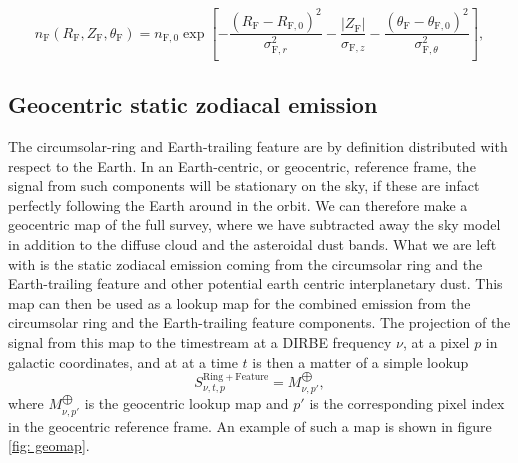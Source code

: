 \documentclass{aa}
\begin{document}
\begin{equation}\label{eq: feature}
   n_\mathrm{F}(R_\mathrm{F}, Z_\mathrm{F}, \theta_\mathrm{F}) = n_{\mathrm{F}, 0} \exp \left[-\frac{\left(R_\mathrm{F}-R_{\mathrm{F}, 0}\right)^{2}}{\sigma_{\mathrm{F}, r}^{2}}-\frac{\left|Z_\mathrm{F}\right|}{\sigma_{\mathrm{F}, z}}-\frac{\left(\theta_\mathrm{F}-\theta_{\mathrm{F}, 0}\right)^{2}}{\sigma_{\mathrm{F}, \theta }^{2}}\right],
\end{equation}

\subsection{Geocentric static zodiacal emission}
The circumsolar-ring and Earth-trailing feature are by definition distributed with respect to the Earth. In an Earth-centric, or geocentric, reference frame, the signal from such components will be stationary on the sky, if these are infact perfectly following the Earth around in the orbit. We can therefore make a geocentric map of the full survey, where we have subtracted away the sky model in addition to the diffuse cloud and the asteroidal dust bands. What we are left with is the static zodiacal emission coming from the circumsolar ring and the Earth-trailing feature and other potential earth centric interplanetary dust. This map can then be used as a lookup map for the combined emission from the circumsolar ring and the Earth-trailing feature components. The projection of the signal from this map to the timestream at a DIRBE frequency $\nu$, at a pixel $p$ in galactic coordinates, and at at a time $t$ is then a matter of a simple lookup
\begin{equation}
    S_{\nu, t, p}^{\mathrm{Ring + Feature}} = M^{\bigoplus}_{\nu, p'},
\end{equation}
where $M^{\bigoplus}_{\nu, p'}$ is the geocentric lookup map and $p'$ is the corresponding pixel index in the geocentric reference frame. An example of such a map is shown in figure \ref{fig: geomap}.
\end{document}
